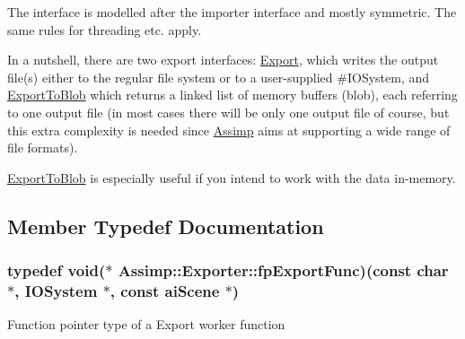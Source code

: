 \-The interface is modelled after the importer interface and mostly symmetric. \-The same rules for threading etc. apply.

\-In a nutshell, there are two export interfaces\-: \hyperlink{classAssimp_1_1Exporter_ab8edf249172567a78ca302278a415e35}{\-Export}, which writes the output file(s) either to the regular file system or to a user-\/supplied \#\-I\-O\-System, and \hyperlink{classAssimp_1_1Exporter_a390c0950a3a164fc431e0797ae1a84d1}{\-Export\-To\-Blob} which returns a linked list of memory buffers (blob), each referring to one output file (in most cases there will be only one output file of course, but this extra complexity is needed since \hyperlink{namespaceAssimp}{\-Assimp} aims at supporting a wide range of file formats).

\hyperlink{classAssimp_1_1Exporter_a390c0950a3a164fc431e0797ae1a84d1}{\-Export\-To\-Blob} is especially useful if you intend to work with the data in-\/memory. 

\subsection{\-Member \-Typedef \-Documentation}
\hypertarget{classAssimp_1_1Exporter_aa67334a75cb24e030af984d01e622f3b}{
\subsubsection[{fp\-Export\-Func}]{\setlength{\rightskip}{0pt plus 5cm}typedef void($\ast$ {\bf \-Assimp\-::\-Exporter\-::fp\-Export\-Func})(const char $\ast$, {\bf \-I\-O\-System} $\ast$, const {\bf ai\-Scene} $\ast$)}}\label{classAssimp_1_1Exporter_aa67334a75cb24e030af984d01e622f3b}
\-Function pointer type of a \-Export worker function 

